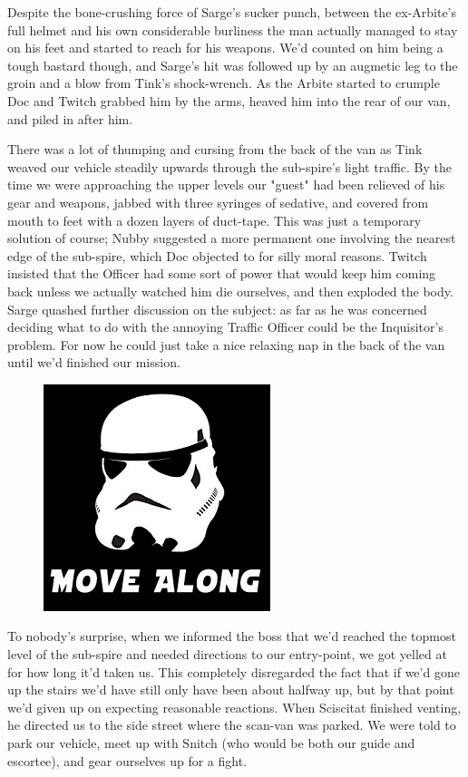 Despite the bone-crushing force of Sarge's sucker punch, between the ex-Arbite's full helmet and his own considerable burliness the man actually managed to stay on his feet and started to reach for his weapons. 
We'd counted on him being a tough bastard though, and Sarge's hit was followed up by an augmetic leg to the groin and a blow from Tink's shock-wrench. 
As the Arbite started to crumple Doc and Twitch grabbed him by the arms, heaved him into the rear of our van, and piled in after him.

There was a lot of thumping and cursing from the back of the van as Tink weaved our vehicle steadily upwards through the sub-spire's light traffic. 
By the time we were approaching the upper levels our "guest" had been relieved of his gear and weapons, jabbed with three syringes of sedative, and covered from mouth to feet with a dozen layers of duct-tape. 
This was just a temporary solution of course; 
Nubby suggested a more permanent one involving the nearest edge of the sub-spire, which Doc objected to for silly moral reasons. 
Twitch insisted that the Officer had some sort of power that would keep him coming back unless we actually watched him die ourselves, and then exploded the body. 
Sarge quashed further discussion on the subject: 
as far as he was concerned deciding what to do with the annoying Traffic Officer could be the Inquisitor's problem. 
For now he could just take a nice relaxing nap in the back of the van until we'd finished our mission.

\begin{figure}
	\begin{center}
		\includegraphics[width=\figwidth]{pics/18/23.png}
	\end{center}
\end{figure}
To nobody's surprise, when we informed the boss that we'd reached the topmost level of the sub-spire and needed directions to our entry-point, we got yelled at for how long it'd taken us. 
This completely disregarded the fact that if we'd gone up the stairs we'd have still only have been about halfway up, but by that point we'd given up on expecting reasonable reactions. 
When Sciscitat finished venting, he directed us to the side street where the scan-van was parked. 
We were told to park our vehicle, meet up with Snitch (who would be both our guide and escortee), and gear ourselves up for a fight.

